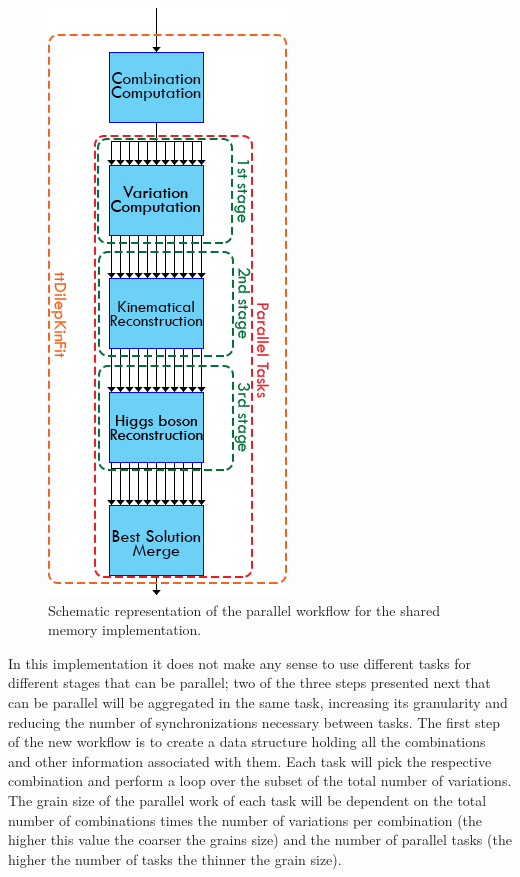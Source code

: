\begin{figure}[!htp]
	\begin{center}
		\includegraphics[scale=0.5]{../../common/img/sharedmem_pipeline.png}
		\caption{Schematic representation of the parallel \ttDilepKinFit workflow for the shared memory implementation.}
		\label{fig:SharedMemPipeline}
	\end{center}
\end{figure}

In this implementation it does not make any sense to use different tasks for different stages that can be parallel; two of the three steps presented next that can be parallel will be aggregated in the same task, increasing its granularity and reducing the number of synchronizations necessary between tasks. The first step of the new workflow is to create a data structure holding all the combinations and other information associated with them. Each task will pick the respective combination and perform a loop over the subset of the total number of variations. The grain size of the parallel work of each task will be dependent on the total number of combinations times the number of variations per combination (the higher this value the coarser the grains size) and the number of parallel tasks (the higher the number of tasks the thinner the grain size).

